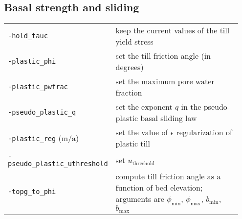 \documentclass[landscape]{article}
\begin{document}
\begin{textblock}{15}
\section{Basal strength and sliding}
\label{sec:basal-strength}
\begin{tabular}{@{}p{0.35\linewidth}p{0.6\linewidth}@{}}
\texttt{-hold_tauc} & keep the current values of the till yield stress\\
\texttt{-plastic_phi} & set the till friction angle (in degrees)\\
\texttt{-plastic_pwfrac} & set the maximum pore water fraction\\
\texttt{-pseudo_plastic_q} & set the exponent $q$ in the pseudo-plastic basal
sliding law\\
\texttt{-plastic_reg} (m/a) & set the value of $\epsilon$ regularization of plastic
till\\
\texttt{-pseudo_plastic_uthreshold} & set $u_{\mathrm{threshold}}$\\
\texttt{-topg_to_phi} & compute till friction angle as a function of bed
elevation; arguments are $\phi_{\mathrm{min}}$, $\phi_{\mathrm{max}}$, $b_{\mathrm{min}}$, $b_{\mathrm{max}}$
\end{tabular}

\end{textblock}
\end{document}
